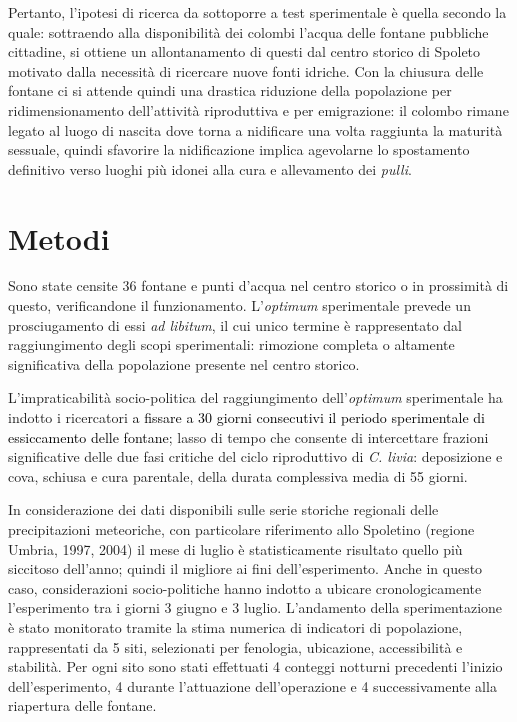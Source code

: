 Pertanto, l{\textquoteright}ipotesi di ricerca da sottoporre a test
sperimentale \`e quella secondo la quale: sottraendo alla
disponibilit\`a dei colombi l{\textquoteright}acqua delle fontane
pubbliche cittadine, si ottiene un allontanamento di questi dal centro
storico di Spoleto motivato dalla necessit\`a di ricercare nuove fonti
idriche. Con la chiusura delle fontane ci si attende quindi una
drastica riduzione della popolazione per ridimensionamento
dell{\textquoteright}attivit\`a riproduttiva e per emigrazione: il
colombo rimane legato al luogo di nascita dove torna a nidificare una
volta raggiunta la maturit\`a sessuale, quindi sfavorire la
nidificazione implica agevolarne lo spostamento definitivo verso luoghi
pi\`u idonei alla cura e allevamento dei \textit{pulli}.

\section*{Metodi}

Sono state censite 36 fontane e punti d{\textquoteright}acqua nel centro
storico o in prossimit\`a di questo, verificandone il funzionamento.
L{\textquoteright}\textit{optimum }sperimentale prevede un
prosciugamento di essi \textit{ad libitum}, il cui unico termine \`e
rappresentato dal raggiungimento degli scopi sperimentali: rimozione
completa o altamente significativa della popolazione presente nel
centro storico.

L{\textquoteright}impraticabilit\`a socio-politica del raggiungimento
dell{\textquoteright}\textit{optimum }sperimentale ha indotto i
ricercatori \textcolor{black}{a fissare a 30 giorni consecutivi il
periodo sperimentale di essiccamento delle fontane}; lasso di tempo che
consente di intercettare frazioni significative delle due fasi critiche
del ciclo riproduttivo di \textit{C. livia}: deposizione e cova,
schiusa e cura parentale, della durata complessiva media di 55 giorni.

In considerazione dei dati disponibili sulle serie storiche regionali
delle precipitazioni meteoriche, con particolare riferimento allo
Spoletino (regione Umbria, 1997, 2004) il mese di luglio \`e
statisticamente risultato quello pi\`u siccitoso
dell{\textquoteright}anno; quindi il migliore ai fini
dell{\textquoteright}esperimento. Anche in questo caso, considerazioni
socio-politiche hanno indotto a ubicare cronologicamente
l{\textquoteright}esperimento tra i giorni 3 giugno e 3 luglio.
L{\textquoteright}andamento della sperimentazione \`e stato monitorato
tramite la stima numerica di indicatori di popolazione, rappresentati
da 5 siti, selezionati per fenologia, ubicazione, accessibilit\`a e
stabilit\`a. Per ogni sito sono stati effettuati 4 conteggi notturni
precedenti l{\textquoteright}inizio dell{\textquoteright}esperimento, 4
durante l{\textquoteright}attuazione dell{\textquoteright}operazione e
4 successivamente alla riapertura delle fontane.

